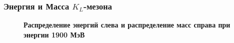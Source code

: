 \documentclass[14pt, hyperref = {colorlinks}]{beamer}
\begin{document}
\begin{frame}
\frametitle{Энергия и Масса $K_{L}$-мезона}
\begin{figure}[h]
\center\textbf{Распределение энергий слева и распределение масс справа при энергии 1900 МэВ}\\
 \begin{minipage}[h]{0.49\linewidth}
  \end{minipage}
  \hfill
  \begin{minipage}[h]{0.49\linewidth}
  \end{minipage}
\end{figure}
\end{frame}
\end{document}
